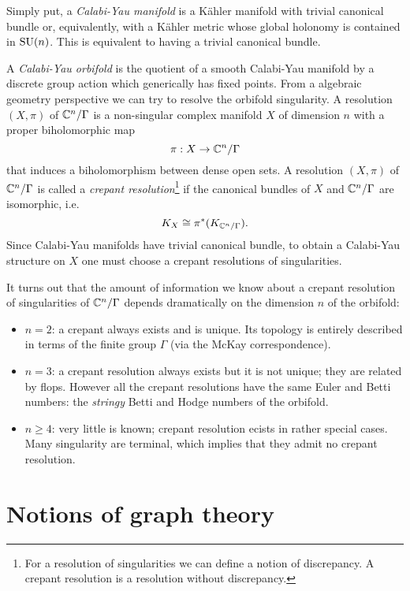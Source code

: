 \documentclass[a4paper,10pt]{article}
\begin{document}
    Simply put, a \emph{Calabi-Yau manifold} is a Kähler manifold with trivial canonical bundle or, equivalently, with a Kähler metric whose global holonomy is contained in $\text{SU}(n)$. This is equivalent to having a trivial canonical bundle.

    A \emph{Calabi-Yau orbifold} is the quotient of a smooth Calabi-Yau manifold by a discrete group action which generically has fixed points. From a algebraic geometry perspective we can try to resolve the orbifold singularity. A resolution $(X,\pi)$ of $\mathbb{C}^n/\Gamma$ is a non-singular complex manifold $X$ of dimension $n$ with a proper biholomorphic map 
    \begin{equation}
        \pi:X\to\mathbb{C}^n/\Gamma
    \end{equation}
    that induces a biholomorphism between dense open sets. A resolution $(X,\pi)$ of $\mathbb{C}^n/\Gamma$ is called a \emph{crepant resolution}\footnote{For a resolution of singularities we can define a notion of discrepancy. A crepant resolution is a resolution
        without discrepancy.} if the canonical bundles of $X$ and $\mathbb{C}^n/\Gamma$ are isomorphic, i.e.
        \begin{equation*}
            K_X\cong\pi^*(K_{\mathbb{C}^n/\Gamma}).
        \end{equation*}
    Since Calabi-Yau manifolds have trivial canonical bundle, to obtain a Calabi-Yau structure on $X$ one must choose a crepant resolutions of singularities.

    It turns out that the amount of information we know about a crepant resolution of singularities of $\mathbb{C}^n/\Gamma$ depends dramatically on the dimension $n$ of the orbifold:
    \begin{itemize}
        \item $n=2$: a crepant always exists and is unique. Its topology is entirely described in terms of the finite group $\Gamma$ (via the McKay correspondence).
        \item $n=3$: a crepant resolution always exists but it is not unique; they are related by flops. However all the crepant resolutions have the same Euler and Betti numbers: the \emph{stringy} Betti and Hodge numbers of the orbifold.
        \item $n\geq4$: very little is known; crepant resolution ecists in rather special cases. Many singularity are terminal, which implies that they admit no crepant resolution.
    \end{itemize}

\section{Notions of graph theory}
\end{document}
